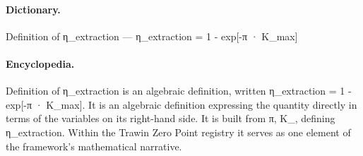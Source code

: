 \paragraph{Dictionary.}
Definition of η\_extraction — η\_extraction = 1 - exp[-π · K\_max]

\paragraph{Encyclopedia.}
Definition of η\_extraction is an algebraic definition, written η\_extraction = 1 - exp[-π · K\_max]. It is an algebraic definition expressing the quantity directly in terms of the variables on its right-hand side. It is built from π, K\_, defining η\_extraction. Within the Trawin Zero Point registry it serves as one element of the framework's mathematical narrative.
